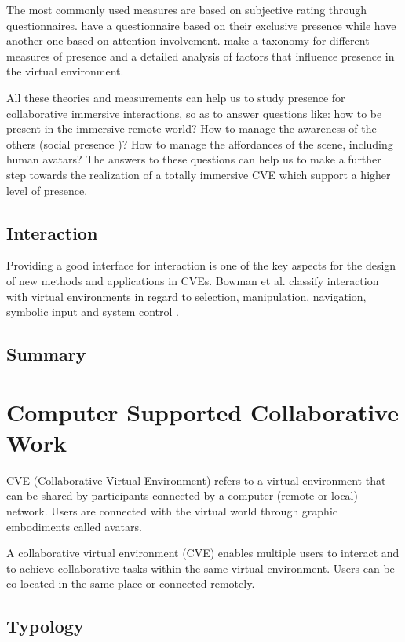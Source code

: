 The most commonly used measures are based on subjective rating through questionnaires.
\citet{Usoh2000Using} have a questionnaire based on their exclusive presence while \citet{Witmer1998MPV} have another one based on attention involvement. \citet{Schuemie2001Pres} make a taxonomy for different measures of presence and a detailed analysis of factors that influence presence in the virtual environment.

All these theories and measurements can help us to study presence for collaborative immersive interactions, so as to answer questions like: how to be present in the immersive remote world? How to manage the awareness of the others (social presence \citep{Mantovani1999Real})? How to manage the affordances of the scene, including human avatars?
The answers to these questions can help us to make a further step towards the realization of a totally immersive CVE which support a higher level of presence.

\subsection{Interaction}
Providing a good interface for interaction is one of the key aspects for the design of new methods and applications in CVEs.
Bowman et al. classify interaction with virtual environments in regard to selection, manipulation, navigation, symbolic input and system control \citep{Bowman2004UIT}.

\subsection{Summary}

\section{Computer Supported Collaborative Work}
CVE (Collaborative Virtual Environment) refers to a virtual environment that can be shared by participants connected by a computer (remote or local) network. Users are connected with the virtual world through graphic embodiments called avatars.

A collaborative virtual environment (CVE) \citep{Benford2001CVE} enables multiple users to interact \citep{Schroeder2006Usability} and to achieve collaborative tasks \citep{Dodds2009Using} within the same virtual environment. Users can be co-located in the same place or connected remotely.

\subsection{Typology}


